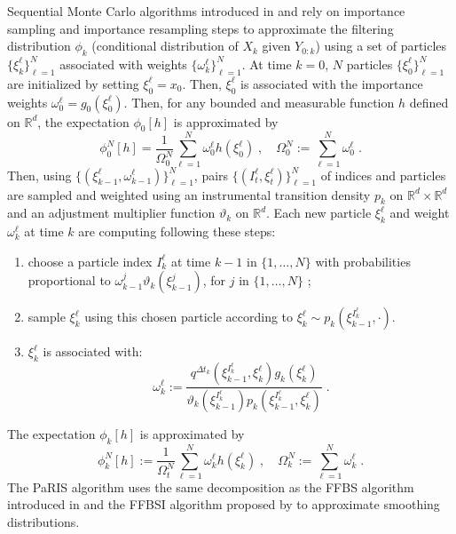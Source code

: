 \documentclass[12pt]{article}
\newcommand{\eqsp}{\;}
\newcommand{\1}{\mathrm{1}}
\begin{document}
Sequential Monte Carlo algorithms introduced in  \cite{gordon:salmond:smith:1993} and \cite{kitagawa:1996} rely on importance sampling and importance resampling steps to approximate the filtering distribution $\phi_{k}$ (conditional distribution of $X_k$ given $Y_{0:k}$) using  a set of particles $\{\xi^{\ell}_k\}_{\ell=1}^N$ associated with weights $\{\omega^{\ell}_k\}_{\ell=1}^N$. At time $k = 0$, $N$ particles $\{\xi^{\ell}_0\}_{\ell=1}^N$ are initialized by setting $\xi^{\ell}_0=x_0$. Then, $\xi^{\ell}_0$ is associated with the importance weights $\omega_0^{\ell} = g_0 \left(\xi^{\ell}_0\right)$. Then, for any bounded and measurable function $h$ defined on $\mathbb{R}^d$, the expectation $\phi_{0}[h] $ is approximated by
\[
\phi^N_{0}[h] = \frac{1}{\Omega_0^N} \sum_{\ell=1}^N \omega_0^{\ell} h \left(\xi^{\ell}_0 \right)\eqsp, \quad \Omega_0^N:= \sum_{\ell=1}^N \omega_0^{\ell}\eqsp.
\]
Then, using $\{(\xi^{\ell}_{k-1},\omega^{\ell}_{k-1})\}_{\ell=1}^N$, pairs $\{(I^{\ell}_t,\xi^{\ell}_{t})\}_{\ell=1}^N$ of indices and particles are sampled and weighted using an instrumental transition density $p_k$ on $\mathbb{R}^d\times \mathbb{R}^d$ and an adjustment multiplier function $\vartheta_k$ on $\mathbb{R}^d$. Each new particle $\xi^{\ell}_{k}$ and weight $\omega^{\ell}_k$ at time $k$ are computing following these steps:
\begin{enumerate}[-]
\item choose a particle index $I^{\ell}_k$ at time $k-1$ in $\{1,\ldots,N\}$ with probabilities proportional to $\omega_{k-1}^{j} \vartheta_k (\xi^{j}_{k-1})$, for $j$ in $\{1,\ldots,N\}$ ;
\item sample  $\xi^{\ell}_{k}$ using this chosen particle according to $\xi^{\ell}_{k} \sim p_k(\xi^{I^{\ell}_k}_{k-1},\cdot)$.
\item $\xi^{\ell}_k$ is associated with:
\[
\omega^{\ell}_k := \frac{q^{\Delta t_{k}}(\xi_{k-1}^{I^{\ell}_k},\xi^{\ell}_k)g_k(\xi^{\ell}_k)}{\vartheta_k(\xi^{I^{\ell}_k}_{k-1}) p_k (\xi_{k-1}^{I^{\ell}_k},\xi^{\ell}_k)}\eqsp.
\]
\end{enumerate} 
The expectation $\phi_{k}[h]$ is approximated by
\[
\phi^N_{k}[h] := \frac{1}{\Omega_t^N} \sum_{\ell=1}^N \omega_k^{\ell} h \left(\xi^{\ell}_k \right)\eqsp,\quad\Omega_k^N:= \sum_{\ell=1}^N \omega_k^{\ell}\eqsp.
\]
The PaRIS algorithm uses the same decomposition as the FFBS algorithm introduced in \cite{doucetgodsillandrieu:2000} and the FFBSI algorithm proposed by \cite{godsill:doucet:west:2004} to approximate smoothing distributions. 
\end{document}
